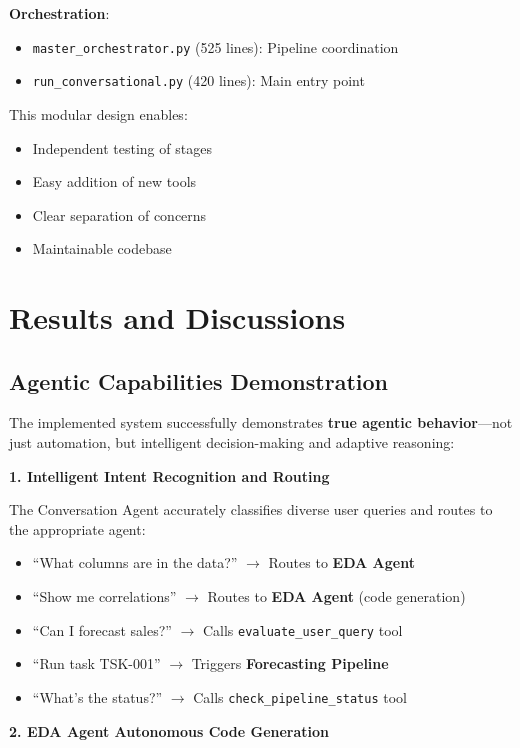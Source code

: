 \documentclass[11pt,a4paper]{article}
\begin{document}
\textbf{Orchestration}:
\begin{itemize}
    \item \texttt{master\_orchestrator.py} (525 lines): Pipeline coordination
    \item \texttt{run\_conversational.py} (420 lines): Main entry point
\end{itemize}

This modular design enables:
\begin{itemize}
    \item Independent testing of stages
    \item Easy addition of new tools
    \item Clear separation of concerns
    \item Maintainable codebase
\end{itemize}

\section{Results and Discussions}

\subsection{Agentic Capabilities Demonstration}

The implemented system successfully demonstrates \textbf{true agentic behavior}---not just automation, but intelligent decision-making and adaptive reasoning:

\textbf{1. Intelligent Intent Recognition and Routing}

The Conversation Agent accurately classifies diverse user queries and routes to the appropriate agent:
\begin{itemize}
    \item ``What columns are in the data?'' $\rightarrow$ Routes to \textbf{EDA Agent}
    \item ``Show me correlations'' $\rightarrow$ Routes to \textbf{EDA Agent} (code generation)
    \item ``Can I forecast sales?'' $\rightarrow$ Calls \texttt{evaluate\_user\_query} tool
    \item ``Run task TSK-001'' $\rightarrow$ Triggers \textbf{Forecasting Pipeline}
    \item ``What's the status?'' $\rightarrow$ Calls \texttt{check\_pipeline\_status} tool
\end{itemize}

\textbf{2. EDA Agent Autonomous Code Generation}
\end{document}
